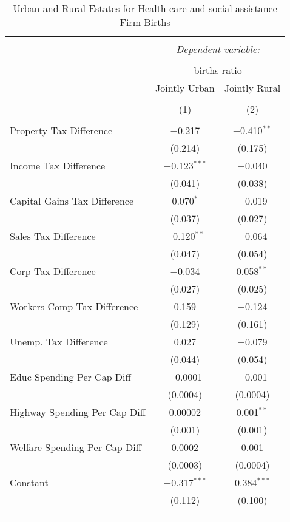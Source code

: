 
\begin{table}[!htbp] \centering 
  \caption{Urban and Rural Estates for  Health care and social assistance Firm Births} 
  \label{} 
\begin{tabular}{@{\extracolsep{5pt}}lcc} 
\\[-1.8ex]\hline 
\hline \\[-1.8ex] 
 & \multicolumn{2}{c}{\textit{Dependent variable:}} \\ 
\cline{2-3} 
\\[-1.8ex] & \multicolumn{2}{c}{births ratio} \\ 
 & Jointly Urban & Jointly Rural \\ 
\\[-1.8ex] & (1) & (2)\\ 
\hline \\[-1.8ex] 
 Property Tax Difference & $-$0.217 & $-$0.410$^{**}$ \\ 
  & (0.214) & (0.175) \\ 
  Income Tax Difference & $-$0.123$^{***}$ & $-$0.040 \\ 
  & (0.041) & (0.038) \\ 
  Capital Gains Tax Difference & 0.070$^{*}$ & $-$0.019 \\ 
  & (0.037) & (0.027) \\ 
  Sales Tax Difference & $-$0.120$^{**}$ & $-$0.064 \\ 
  & (0.047) & (0.054) \\ 
  Corp Tax Difference & $-$0.034 & 0.058$^{**}$ \\ 
  & (0.027) & (0.025) \\ 
  Workers Comp Tax Difference & 0.159 & $-$0.124 \\ 
  & (0.129) & (0.161) \\ 
  Unemp. Tax Difference & 0.027 & $-$0.079 \\ 
  & (0.044) & (0.054) \\ 
  Educ Spending Per Cap Diff & $-$0.0001 & $-$0.001 \\ 
  & (0.0004) & (0.0004) \\ 
  Highway Spending Per Cap Diff & 0.00002 & 0.001$^{**}$ \\ 
  & (0.001) & (0.001) \\ 
  Welfare Spending Per Cap Diff & 0.0002 & 0.001 \\ 
  & (0.0003) & (0.0004) \\ 
  Constant & $-$0.317$^{***}$ & 0.384$^{***}$ \\ 
  & (0.112) & (0.100) \\ 
 \hline \\[-1.8ex] 
\hline 
\hline \\[-1.8ex] 
\end{tabular} 
\end{table} 
